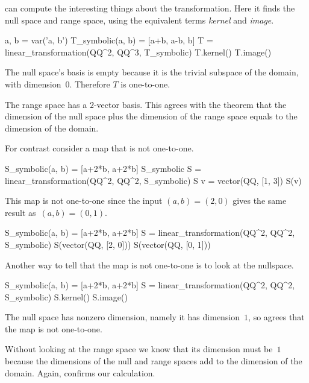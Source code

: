 \Sage{} can compute the interesting things about the transformation.
Here it finds the null space 
and range space, using the equivalent 
terms \textit{kernel} and \textit{image}.
\begin{sageoutput}[d,0,3]
a, b = var('a, b')   
T_symbolic(a, b) = [a+b, a-b, b]         
T = linear_transformation(QQ^2, QQ^3, T_symbolic)
T.kernel()                                       
T.image()                                        
\end{sageoutput}
The null space's basis is empty because 
it is the trivial subspace of the domain,
with dimension~$0$.
Therefore $T$ is one-to-one.

The range space has a $2$-vector basis. 
This agrees with the theorem that
the dimension of the null space plus the dimension of the 
range space equals to the dimension of the domain.

For contrast consider a map that is not one-to-one.
\begin{sageoutput}
S_symbolic(a, b) = [a+2*b, a+2*b]
S_symbolic
S = linear_transformation(QQ^2, QQ^2, S_symbolic)
S
v = vector(QQ, [1, 3])  
S(v)
\end{sageoutput}
\noindent This map is not one-to-one since the input $(a,b)=(2,0)$  gives
the same result as~$(a,b)=(0,1)$.  
\begin{sageoutput}[d,0,2]
S_symbolic(a, b) = [a+2*b, a+2*b]
S = linear_transformation(QQ^2, QQ^2, S_symbolic)
S(vector(QQ, [2, 0]))
S(vector(QQ, [0, 1]))
\end{sageoutput}
\noindent
Another way to tell that the map is not one-to-one is to look at the 
nullspace.
\begin{sageoutput}[d,0,2]
S_symbolic(a, b) = [a+2*b, a+2*b]
S = linear_transformation(QQ^2, QQ^2, S_symbolic)
S.kernel()
S.image()
\end{sageoutput}
The null space has nonzero dimension, namely it 
has dimension~$1$,
so \Sage{} agrees that the map is not one-to-one.

Without looking at the range space we know that its dimension must be~$1$ 
because the dimensions of the null and range spaces add to
the dimension of the domain.
Again, \Sage{} confirms our calculation.



